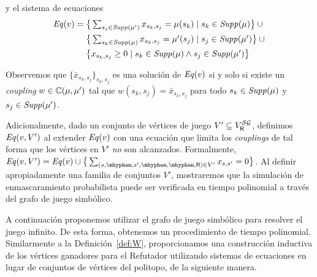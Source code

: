 \begin{definition}
  y el sistema de ecuaciones 
  {%
  \begin{align*}
    \mathit{Eq}(v) = {}
    & \textstyle
    \big\{ \sum_{s_j \in \mathit{Supp}(\mu')} x_{s_k,s_j}=\mu(s_k) \mid s_k \in \mathit{Supp}(\mu) \big\} \cup {} \\
    & \textstyle
    \big\{ \sum_{s_k \in \mathit{Supp}(\mu)} x_{s_k,s_j}=\mu'(s_j) \mid s_j \in \mathit{Supp}(\mu') \big\} \cup {} \\
    & \textstyle
    \big\{ x_{s_k,s_j} \geq 0 \mid s_k \in \mathit{Supp}(\mu) \wedge s_j \in \mathit{Supp}(\mu') \big\}
  \end{align*}
  }%
\end{definition} 


Observemos que $\{\bar{x}_{s_k,s_j}\}_{s_k,s_j}$ es una solución de 
$\mathit{Eq}(v)$ si y solo si existe un \emph{coupling}
$w\in\mathbb{C}(\mu,\mu')$ tal que  $w(s_k,s_j)=\bar{x}_{s_k,s_j}$
para todo $s_k \in \mathit{Supp}(\mu)$ y $s_j \in \mathit{Supp}(\mu')$.

Adicionalmente, dado un conjunto de vértices de juego
$V' \subseteq V^{\mathcal{SG}}_{\mathsf{R}}$,
definimos $\mathit{Eq}(v, V')$ al extender $\mathit{Eq}(v)$ con una ecuación que limita los \emph{couplings} de tal forma que los vértices en $V'$ \emph{no} son alcanzados.
Formalmente,
%
$\Eq(v, V') = \Eq(v) \cup \big\{\sum_{(s, \mhyphen, s', \mhyphen, \mhyphen, \Refuter) \in V'} x_{s,s'} = 0\big\}$.
%
Al definir apropiadamente una familia de conjuntos $V'$, mostraremos que la simulación de enmascaramiento probabilista puede ser verificada en tiempo polinomial a través del grafo de juego simbólico.



A continuación proponemos utilizar el grafo de juego simbólico para resolver el juego infinito. De esta forma, obtenemos un procedimiento de tiempo polinomial.
Similarmente a la Definición~\ref{def:W}, proporcionamos una construcción inductiva de los vértices ganadores para el Refutador utilizando sistemas de ecuaciones en lugar de conjuntos de vértices del politopo, de la siguiente manera.

